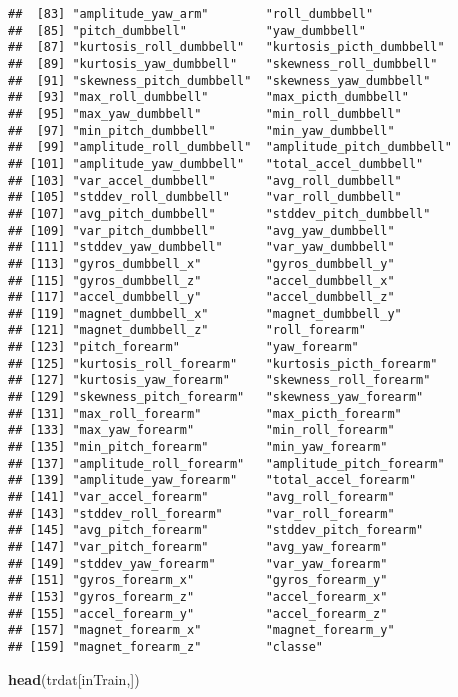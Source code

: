 \documentclass[]{article}
\newenvironment{Shaded}{\begin{snugshade}}{\end{snugshade}}
\newcommand{\KeywordTok}[1]{\textcolor[rgb]{0.13,0.29,0.53}{\textbf{#1}}}
\newcommand{\NormalTok}[1]{#1}
\begin{document}
\begin{verbatim}
##  [83] "amplitude_yaw_arm"        "roll_dumbbell"           
##  [85] "pitch_dumbbell"           "yaw_dumbbell"            
##  [87] "kurtosis_roll_dumbbell"   "kurtosis_picth_dumbbell" 
##  [89] "kurtosis_yaw_dumbbell"    "skewness_roll_dumbbell"  
##  [91] "skewness_pitch_dumbbell"  "skewness_yaw_dumbbell"   
##  [93] "max_roll_dumbbell"        "max_picth_dumbbell"      
##  [95] "max_yaw_dumbbell"         "min_roll_dumbbell"       
##  [97] "min_pitch_dumbbell"       "min_yaw_dumbbell"        
##  [99] "amplitude_roll_dumbbell"  "amplitude_pitch_dumbbell"
## [101] "amplitude_yaw_dumbbell"   "total_accel_dumbbell"    
## [103] "var_accel_dumbbell"       "avg_roll_dumbbell"       
## [105] "stddev_roll_dumbbell"     "var_roll_dumbbell"       
## [107] "avg_pitch_dumbbell"       "stddev_pitch_dumbbell"   
## [109] "var_pitch_dumbbell"       "avg_yaw_dumbbell"        
## [111] "stddev_yaw_dumbbell"      "var_yaw_dumbbell"        
## [113] "gyros_dumbbell_x"         "gyros_dumbbell_y"        
## [115] "gyros_dumbbell_z"         "accel_dumbbell_x"        
## [117] "accel_dumbbell_y"         "accel_dumbbell_z"        
## [119] "magnet_dumbbell_x"        "magnet_dumbbell_y"       
## [121] "magnet_dumbbell_z"        "roll_forearm"            
## [123] "pitch_forearm"            "yaw_forearm"             
## [125] "kurtosis_roll_forearm"    "kurtosis_picth_forearm"  
## [127] "kurtosis_yaw_forearm"     "skewness_roll_forearm"   
## [129] "skewness_pitch_forearm"   "skewness_yaw_forearm"    
## [131] "max_roll_forearm"         "max_picth_forearm"       
## [133] "max_yaw_forearm"          "min_roll_forearm"        
## [135] "min_pitch_forearm"        "min_yaw_forearm"         
## [137] "amplitude_roll_forearm"   "amplitude_pitch_forearm" 
## [139] "amplitude_yaw_forearm"    "total_accel_forearm"     
## [141] "var_accel_forearm"        "avg_roll_forearm"        
## [143] "stddev_roll_forearm"      "var_roll_forearm"        
## [145] "avg_pitch_forearm"        "stddev_pitch_forearm"    
## [147] "var_pitch_forearm"        "avg_yaw_forearm"         
## [149] "stddev_yaw_forearm"       "var_yaw_forearm"         
## [151] "gyros_forearm_x"          "gyros_forearm_y"         
## [153] "gyros_forearm_z"          "accel_forearm_x"         
## [155] "accel_forearm_y"          "accel_forearm_z"         
## [157] "magnet_forearm_x"         "magnet_forearm_y"        
## [159] "magnet_forearm_z"         "classe"
\end{verbatim}

\begin{Shaded}
\begin{Highlighting}[]
\KeywordTok{head}\NormalTok{(trdat[inTrain,])}
\end{Highlighting}
\end{Shaded}
\end{document}
